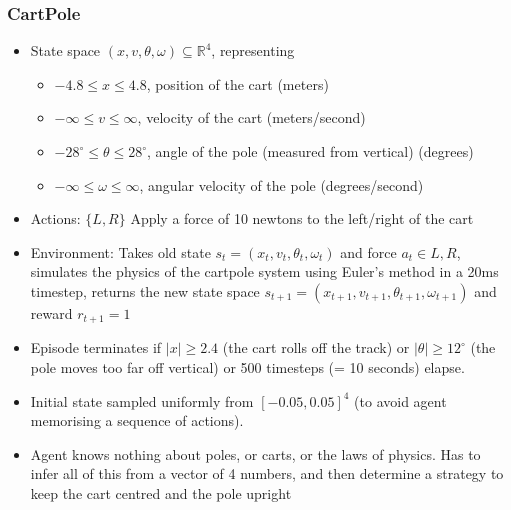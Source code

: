 \documentclass[10pt,a4paper]{beamer}
\begin{document}
\begin{frame}
	\frametitle{CartPole}
	\begin{itemize}
		\item State space $(x, v, \theta, \omega) \subseteq \mathbb{R}^4$, representing
		\begin{itemize}
			\item $-4.8 \leq x \leq 4.8$, position of the cart (meters)
			\item $-\infty \leq v \leq \infty$, velocity of the cart (meters/second)
			\item $-28^\circ \leq \theta \leq 28^\circ$, angle of the pole (measured from vertical) (degrees)
			\item $-\infty \leq \omega \leq \infty$, angular velocity of the pole (degrees/second)  
		\end{itemize}
		\item Actions: $\{L,R\}$ Apply a force of 10 newtons to the left/right of the cart
		\item Environment: Takes old state $s_t = (x_t, v_t, \theta_t, \omega_t)$ and
		force $a_t \in {L,R}$, simulates the physics of the cartpole system using Euler's method
		in a 20ms timestep, returns the new state space 
		$s_{t+1} = (x_{t+1}, v_{t+1}, \theta_{t+1}, \omega_{t+1})$ and reward $r_{t+1} = 1$
		\item Episode terminates if $|x| \geq 2.4$ (the cart rolls off the track)
		or $|\theta| \geq 12^\circ$ (the pole moves too far off vertical) or 500 timesteps (= 10 seconds)
		elapse.
		\item Initial state sampled uniformly from $[-0.05, 0.05]^4$ (to avoid agent memorising 
		a sequence of actions).
		\item Agent knows nothing about poles, or carts, or the laws of physics. Has to infer all of this from
		a vector of 4 numbers, and then determine a strategy to keep the cart centred and the pole upright
	\end{itemize}
\end{frame}
\end{document}
